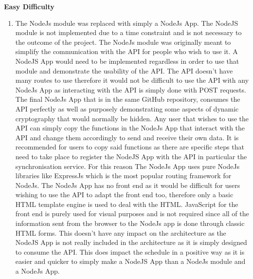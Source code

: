 \textbf{Easy Difficulty}
\begin{enumerate}
\item The NodeJs module was replaced with simply a NodeJs App. The NodeJS module is not implemented due to a time constraint and is not necessary to the outcome of the project. The NodeJs module was originally meant to simplify the communication with the API for people who wish to use it. A NodeJS App would need to be implemented regardless in order to use that module and demonstrate the usability of the API. 
The API doesn't have many routes to use therefore it would not be difficult to use the API with any NodeJs App as interacting with the API is simply done with POST requests. The final NodeJs App that is in the same GitHub repository, consumes the API perfectly as well as purposely demonstrating some aspects of dynamic cryptography that would normally be hidden. Any user that wishes to use the API can simply copy the functions in the NodeJs App that interact with the API and change them accordingly to send and receive their own data. It is recommended for users to copy said functions as there are specific steps that need to take place to register the NodeJS App with the API in particular the synchronisation service. For this reason The NodeJs App uses pure NodeJs libraries like ExpressJs \cite{ExpressJS} which is the most popular routing framework for NodeJs. The NodeJs App has no front end as it would be difficult for users wishing to use the API to adapt the front end too, therefore only a basic HTML template engine is used to deal with the HTML. JavaScript for the front end is purely used for visual purposes and is not required since all of the information sent from the browser to the NodeJs app is done through classic HTML forms. This doesn't have any impact on the architecture as the NodeJS App is not really included in the architecture as it is simply designed to consume the API. This does impact the schedule in a positive way as it is easier and quicker to simply make a NodeJS App than a NodeJs module and a NodeJs App.
\end{enumerate}

